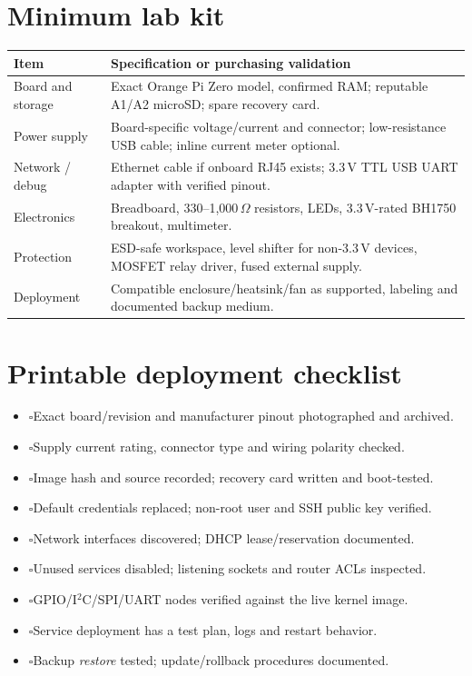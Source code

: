 \documentclass[10pt,oneside,openany]{report}
\newcommand{\checkitem}{\(\square\)\;}
\begin{document}
\section{Minimum lab kit}
\begin{center}\small\begin{tabularx}{\textwidth}{@{}>{\raggedright\arraybackslash}p{3.5cm}>{\raggedright\arraybackslash}X@{}}\toprule
\textbf{Item} & \textbf{Specification or purchasing validation}\\\midrule
Board and storage & Exact Orange Pi Zero model, confirmed RAM; reputable A1/A2 microSD; spare recovery card.\\
Power supply & Board-specific voltage/current and connector; low-resistance USB cable; inline current meter optional.\\
Network / debug & Ethernet cable if onboard RJ45 exists; 3.3\,V TTL USB UART adapter with verified pinout.\\
Electronics & Breadboard, 330--1,000\,\(\Omega\) resistors, LEDs, 3.3\,V-rated BH1750 breakout, multimeter.\\
Protection & ESD-safe workspace, level shifter for non-3.3\,V devices, MOSFET relay driver, fused external supply.\\
Deployment & Compatible enclosure/heatsink/fan as supported, labeling and documented backup medium.\\\bottomrule\end{tabularx}\end{center}
\section{Printable deployment checklist}
\begin{itemize}[itemsep=9pt]
\item \checkitem Exact board/revision and manufacturer pinout photographed and archived.
\item \checkitem Supply current rating, connector type and wiring polarity checked.
\item \checkitem Image hash and source recorded; recovery card written and boot-tested.
\item \checkitem Default credentials replaced; non-root user and SSH public key verified.
\item \checkitem Network interfaces discovered; DHCP lease/reservation documented.
\item \checkitem Unused services disabled; listening sockets and router ACLs inspected.
\item \checkitem GPIO/I\(^{2}\)C/SPI/UART nodes verified against the live kernel image.
\item \checkitem Service deployment has a test plan, logs and restart behavior.
\item \checkitem Backup \emph{restore} tested; update/rollback procedures documented.
\end{itemize}
\end{document}
